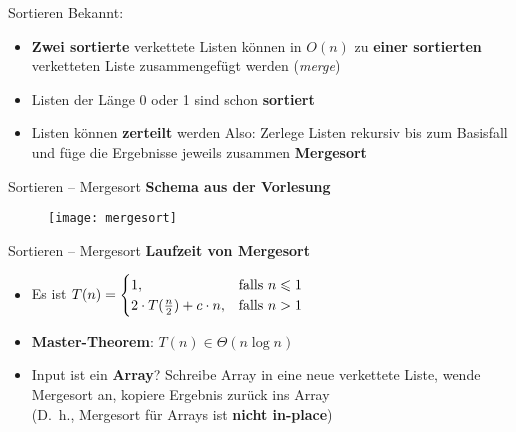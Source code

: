 \begin{frame}{Sortieren}
	Bekannt:   %
	\begin{itemize}
		\item \textbf{Zwei sortierte} verkettete Listen können in $O(n)$ zu \textbf{einer sortierten} verketteten Liste zusammengefügt werden (\emph{merge})
		\pause
		\item Listen der Länge 0 oder 1 sind schon \textbf{sortiert}
		\pause
		\item Listen können \textbf{zerteilt} werden
		\pause
		\implitem Also: Zerlege Listen rekursiv bis zum Basisfall und füge die Ergebnisse jeweils zusammen \impl \textbf{Mergesort}
		\begin{algorithm}[H]
		\end{algorithm}
	\end{itemize}
\end{frame}

\begin{frame}{Sortieren – Mergesort}
	\textbf{Schema aus der Vorlesung}
	\begin{figure}[htp]
		\centering
		\texttt{[image: mergesort]}
	\end{figure}
\end{frame}


\begin{frame}{Sortieren – Mergesort}
	\textbf{Laufzeit von Mergesort}
	\pause
	\begin{itemize}
		\item Es ist $T(n) = \begin{cases}
			1, & \text{falls } n \leq 1 \\
			2 \cdot T(\fract n/2 ) + c \cdot n, & \text{falls } n > 1
		\end{cases}$
		\pause
		\item \textbf{Master-Theorem}: \quad $T(n) \in \Theta(n \log n)$
		\pause
		\item Input ist ein \textbf{Array}? \impl  Schreibe Array in eine neue verkettete Liste, wende Mergesort an, kopiere Ergebnis zurück ins Array \\
		(\impl D.~h., Mergesort für Arrays ist \textbf{nicht in-place})
	\end{itemize}
\end{frame}

